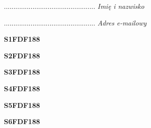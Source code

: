 \begin{turn}{90}\begin{minipage}{\linewidth} \vspace{20mm} ................................................  \textit{Imię i nazwisko}\end{minipage}\end{turn}

\begin{turn}{90}\begin{minipage}{\linewidth} \vspace{20mm} ................................................  \textit{Adres e-mailowy}\end{minipage}\end{turn}

\begin{turn}{90}\huge \begin{minipage}{\linewidth} \vspace{10mm}\textbf{S1FDF188}\end{minipage}\end{turn}

\begin{turn}{90}\huge \begin{minipage}{\linewidth} \vspace{10mm}\textbf{S2FDF188}\end{minipage}\end{turn}

\begin{turn}{90}\huge \begin{minipage}{\linewidth} \vspace{10mm}\textbf{S3FDF188}\end{minipage}\end{turn}

\begin{turn}{90}\huge \begin{minipage}{\linewidth} \vspace{10mm}\textbf{S4FDF188}\end{minipage}\end{turn}

\begin{turn}{90}\huge \begin{minipage}{\linewidth} \vspace{10mm}\textbf{S5FDF188}\end{minipage}\end{turn}

\begin{turn}{90}\huge \begin{minipage}{\linewidth} \vspace{10mm}\textbf{S6FDF188}\end{minipage}\end{turn}

